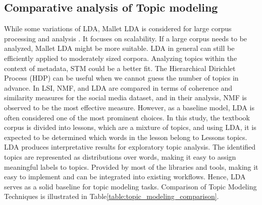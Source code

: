 \documentclass[sn-mathphys,Numbered]{sn-jnl}%
\theoremstyle{thmstyleone}%
\theoremstyle{thmstyletwo}%
\theoremstyle{thmstylethree}%
\begin{document}
\subsection{Comparative analysis of Topic modeling} 
While some variations of LDA, Mallet LDA is considered for large corpus processing and analysis \cite{vayansky2020review, abdelrazek2022topic, Comparison_Topic_Modeling_Algorithms}. It focuses on scalability. If a large corpus needs to be analyzed, Mallet LDA might be more suitable. LDA in general can still be efficiently applied to moderately sized corpora. Analyzing topics within the context of metadata, STM could be a better fit. The Hierarchical Dirichlet Process (HDP) can be useful when we cannot guess the number of topics in advance. In \cite{Comparison_Topic_Modeling_Algorithms} LSI, NMF, and LDA are compared in terms of coherence and similarity measures for the social media dataset, and in their analysis, NMF is observed to be the most effective measure. However, as a baseline model, LDA is often considered one of the most prominent choices. In this study, the textbook corpus is divided into lessons, which are a mixture of topics, and using LDA, it is expected to be determined which words in the lesson belong to Lesson\textquotesingle s topics. LDA produces interpretative results for exploratory topic analysis. The identified topics are represented as distributions over words, making it easy to assign meaningful labels to topics. Provided by most of the libraries and tools, making it easy to implement and can be integrated into existing workflows. Hence, LDA serves as a solid baseline for topic modeling tasks. Comparison of Topic Modeling Techniques is illustrated in Table\ref{table:topic_modeling_comparison}.
\end{document}
